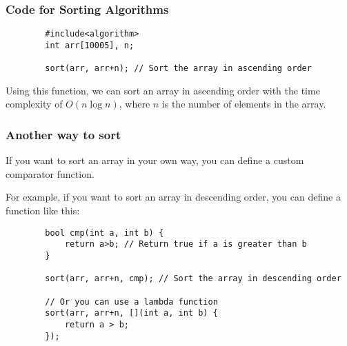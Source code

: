 \documentclass[xcolor=dvipsnames]{beamer}
\begin{document}
	\begin{frame}[fragile]
        \frametitle{Code for Sorting Algorithms}
        \begin{verbatim}
        #include<algorithm>
        int arr[10005], n;

        sort(arr, arr+n); // Sort the array in ascending order

        \end{verbatim}
        Using this function, we can sort an array in ascending order with the time complexity of $O(n \log n)$,
        where $n$ is the number of elements in the array.
	\end{frame}

    \begin{frame}[fragile]
        \frametitle{Another way to sort}
        If you want to sort an array in your own way,
        you can define a custom comparator function.

        For example, if you want to sort an array in descending order,
        you can define a function like this:
        \begin{verbatim}
        bool cmp(int a, int b) {
            return a>b; // Return true if a is greater than b
        }

        sort(arr, arr+n, cmp); // Sort the array in descending order

        // Or you can use a lambda function
        sort(arr, arr+n, [](int a, int b) {
            return a > b;
        });
        \end{verbatim}

    \end{frame}
\end{document}
